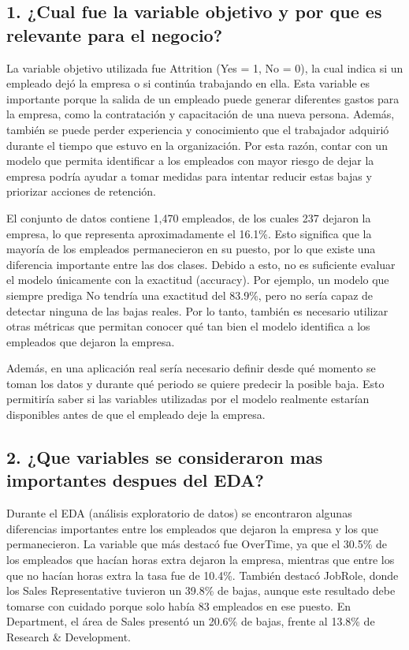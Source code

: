 \documentclass[letterpaper,11pt]{article}
\begin{document}
\subsection*{1. ¿Cual fue la variable objetivo y por que es relevante para el negocio?}

La variable objetivo utilizada fue Attrition (Yes = 1, No = 0), la cual indica si un empleado dejó la empresa o si continúa trabajando en ella. Esta variable es importante porque la salida de un empleado puede generar diferentes gastos para la empresa, como la contratación y capacitación de una nueva persona. Además, también se puede perder experiencia y conocimiento que el trabajador adquirió durante el tiempo que estuvo en la organización. Por esta razón, contar con un modelo que permita identificar a los empleados con mayor riesgo de dejar la empresa podría ayudar a tomar medidas para intentar reducir estas bajas y priorizar acciones de retención.

El conjunto de datos contiene 1,470 empleados, de los cuales 237 dejaron la empresa, lo que representa aproximadamente el 16.1\%. Esto significa que la mayoría de los empleados permanecieron en su puesto, por lo que existe una diferencia importante entre las dos clases. Debido a esto, no es suficiente evaluar el modelo únicamente con la exactitud (accuracy). Por ejemplo, un modelo que siempre prediga No tendría una exactitud del 83.9\%, pero no sería capaz de detectar ninguna de las bajas reales. Por lo tanto, también es necesario utilizar otras métricas que permitan conocer qué tan bien el modelo identifica a los empleados que dejaron la empresa.

Además, en una aplicación real sería necesario definir desde qué momento se toman los datos y durante qué periodo se quiere predecir la posible baja. Esto permitiría saber si las variables utilizadas por el modelo realmente estarían disponibles antes de que el empleado deje la empresa.

\subsection*{2. ¿Que variables se consideraron mas importantes despues del EDA?}

Durante el EDA (análisis exploratorio de datos) se encontraron algunas diferencias importantes entre los empleados que dejaron la empresa y los que permanecieron. La variable que más destacó fue OverTime, ya que el 30.5\% de los empleados que hacían horas extra dejaron la empresa, mientras que entre los que no hacían horas extra la tasa fue de 10.4\%. También destacó JobRole, donde los Sales Representative tuvieron un 39.8\% de bajas, aunque este resultado debe tomarse con cuidado porque solo había 83 empleados en ese puesto. En Department, el área de Sales presentó un 20.6\% de bajas, frente al 13.8\% de Research \& Development.
\end{document}
